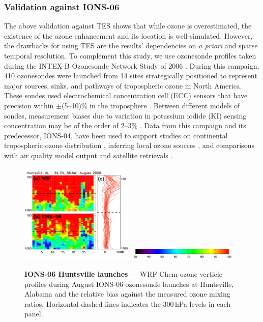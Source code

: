 \subsubsection{Validation against IONS-06}

The above validation against TES shows that while ozone is overestimated, the existence of the ozone enhancement and its location is well-simulated.
However, the drawbacks for using TES are the results' dependencies on {\it a priori} and sparse temporal resolution. To complement this study,
we use ozonesonde profiles taken during the INTEX-B Ozonesonde Network Study of 2006 \citep[IONS-06;][]{Thompson:2008rp}. During this campaign,
410 ozonesondes were launched from 14 sites strategically positioned to represent major sources, sinks, and pathways of tropospheric ozone in North
America. These sondes used electrochemical concentration cell (ECC) sensors that have precision within $\pm$(5--10)\% in the troposphere
\citep{Smit:2007ta}. Between different models of sondes, measurement biases due to variation in potassium iodide (KI) sensing concentration may be of the
order of 2--3\% \citep{Smit:2007ta}. Data from this campaign and its predecessor, IONS-04, have been used to support studies on continental tropospheric
ozone distribution \citep{Cooper:2007cr}, inferring local ozone sources \citep{Thompson:2008rp}, and comparisons with air quality model output
\citep{Tarasick:2007dq} and satellite retrievals \citep{Nassar:2008mw}.

	\begin{figure}
		\centering
		\begin{singlespacing}
		\vspace{-.35in}
		\includegraphics[width=0.48\textwidth]{o3/ions_huntsville}
		\includegraphics[width=0.48\textwidth]{o3/o3_colorbar}
		\caption[IONS-06 Huntsville launches]{\small\textbf{IONS-06 Huntsville launches} --- WRF-Chem ozone verticle profiles during August IONS-06
		ozonesonde launches at Huntsville, Alabama and the relative bias against the measured ozone mixing ratios. Horizontal dashed lines indicates
		the 300\,\unit{hPa} levels in each panel.\vspace{-.2in}}
		\label{fig:2006/ions-hunts}
		\end{singlespacing}
	\end{figure}

